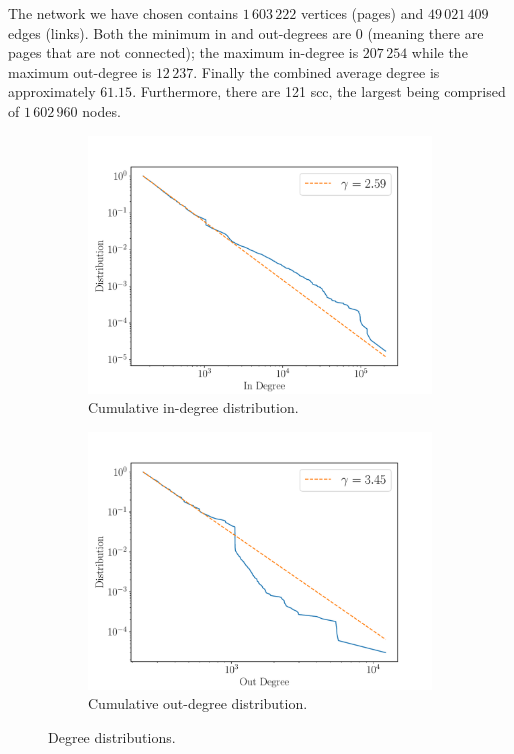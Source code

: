 \documentclass[9pt,a4paper,twocolumn,notitlepage]{article}
\begin{document}
The network we have chosen contains $1\,603\,222$ vertices (pages) and $49\,021\,409$ edges (links). Both the minimum in and out-degrees are $0$ (meaning there are pages that are not connected); the maximum in-degree is $207\,254$ while the maximum out-degree is $12\,237$. Finally the combined average degree is approximately $61.15$. Furthermore, there are 121 \acrfull{scc}, the largest being comprised of $1\,602\,960$ nodes.
\vspace{1\baselineskip}

\begin{figure}[h]
	\centering
	\begin{subfigure}{.475\textwidth}
		\centering
		\includegraphics[width=\linewidth]{wikipedia_pt_in.pdf}
		\caption{Cumulative in-degree distribution.}
		\label{fig:inddist}
	\end{subfigure}
	\begin{subfigure}{.475\textwidth}
		\centering
		\includegraphics[width=\linewidth]{wikipedia_pt_out.pdf}
		\caption{Cumulative out-degree distribution.}
		\label{fig:outddist}
	\end{subfigure}
	\caption{Degree distributions.}
\end{figure}
\end{document}
